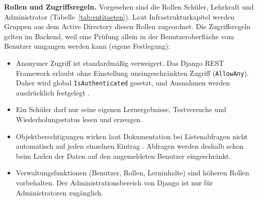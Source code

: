\textbf{Rollen und Zugriffsregeln.} Vorgesehen sind die Rollen Schüler, Lehrkraft und Administrator (Tabelle~\ref{tab:entitaeten}). Laut Infrastrukturkapitel werden Gruppen aus dem Active Directory diesen Rollen zugeordnet. Die Zugriffsregeln gelten im Backend, weil eine Prüfung allein in der Benutzeroberfläche vom Benutzer umgangen werden kann (eigene Festlegung):
\begin{itemize}
    \item Anonymer Zugriff ist standardmäßig verweigert. Das Django REST Framework erlaubt ohne Einstellung uneingeschränkten Zugriff (\texttt{AllowAny}). Daher wird global \texttt{IsAuthenticated} gesetzt, und Ausnahmen werden ausdrücklich festgelegt \parencite{drfPermissions}.
    \item Ein Schüler darf nur seine eigenen Lernergebnisse, Testversuche und Wiederholungsstatus lesen und erzeugen.
    \item Objektberechtigungen wirken laut Dokumentation bei Listenabfragen nicht automatisch auf jeden einzelnen Eintrag \parencite{drfPermissions}. Abfragen werden deshalb schon beim Laden der Daten auf den angemeldeten Benutzer eingeschränkt.
    \item Verwaltungsfunktionen (Benutzer, Rollen, Lerninhalte) sind höheren Rollen vorbehalten. Der Administrationsbereich von Django ist nur für Administratoren zugänglich.
\end{itemize}
 
